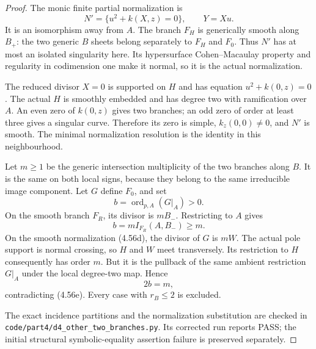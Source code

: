 \begin{proof}
The monic finite partial normalization is
\[
      N'=\{u^2+k(X,z)=0\},\qquad Y=Xu.
                                                            \tag{4.56d}
\]
It is an isomorphism away from $A$. The branch $F_H$
is generically smooth along $B_+$: the two generic
$B$ sheets belong separately to $F_H$ and $F_0$.
Thus $N'$ has at most an isolated singularity here.
Its hypersurface Cohen--Macaulay property and regularity
in codimension one make it normal, so it is the actual
normalization.

The reduced divisor $X=0$ is supported on $H$ and has
equation $u^2+k(0,z)=0$. The actual $H$ is smoothly
embedded and has degree two with ramification over $A$.
An even zero of $k(0,z)$ gives two branches; an odd
zero of order at least three gives a singular curve.
Therefore its zero is simple, $k_z(0,0)\ne0$, and
$N'$ is smooth. The minimal normalization resolution
is the identity in this neighbourhood.

Let $m\ge1$ be the generic intersection multiplicity of
the two branches along $B$. It is the same on both
local signs, because they belong to the same irreducible
image component. Let $G$ define $F_0$, and set
\[
                      b=\operatorname{ord}_{p,A}(G|_A)>0.
\]
On the smooth branch $F_R$, its divisor is $mB_-$.
Restricting to $A$ gives
\[
                 b=m I_{F_R}(A,B_-)\ge m.                \tag{4.56e}
\]
On the smooth normalization (4.56d), the divisor of $G$
is $mW$. The actual pole support is normal crossing,
so $H$ and $W$ meet transversely. Its restriction to
$H$ consequently has order $m$. But it is the pullback
of the same ambient restriction $G|_A$ under the local
degree-two map. Hence
\[
                              2b=m,
\]
contradicting (4.56e). Every case with $r_B\le2$ is
excluded.

The exact incidence partitions and the normalization
substitution are checked in
\texttt{code/part4/d4\_other\_two\_branches.py}.
Its corrected run reports PASS; the initial structural
symbolic-equality assertion failure is preserved separately.
\end{proof}
